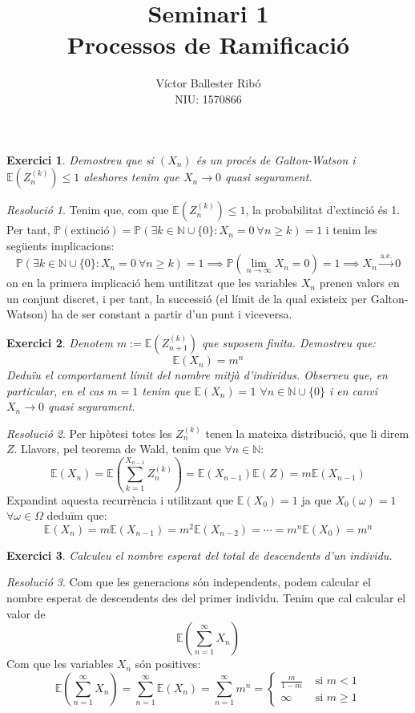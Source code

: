 \documentclass[10pt,a4paper]{article}
\title{\bfseries\Large Seminari 1\\Processos de Ramificació}
\author{Víctor Ballester Ribó\\NIU: 1570866}
\date{\parbox{\linewidth}{\centering
  Processos estocàstic\endgraf
  Grau en Matemàtiques\endgraf
  Universitat Autònoma de Barcelona\endgraf
  Març de 2023}}
\newcommand{\NN}{\ensuremath{\mathbb{N}}} %
\newcommand{\Prob}{\ensuremath{\mathbb{P}}} %
\newcommand{\Exp}{\mathbb{E}} %
\newcommand{\almoste}[1]{\overset{\text{a.e.}}{#1}} %
\newtheorem{exercici}{Exercici}
\theoremstyle{definition}
\theoremstyle{remark}
\newtheorem{res}{Resolució}
\begin{document}
\maketitle
\begin{exercici}
  Demostreu que si $(X_n)$ és un procés de Galton-Watson i $\Exp(Z_n^{(k)}) \leq 1$ aleshores tenim que $X_n \to 0$ quasi segurament.
\end{exercici}
\begin{res}
  Tenim que, com que $\Exp(Z_n^{(k)}) \leq 1$, la probabilitat d'extinció és 1. Per tant, $\Prob(\text{extinció})=\Prob\left(\exists k\in\NN\cup\{0\}:X_n=0\ \forall n\geq k\right)=1$ i tenim les següents implicacions:
  \begin{equation*}
    \Prob\left(\exists k\in\NN\cup\{0\}:X_n=0\ \forall n\geq k\right)=1 \implies\Prob(\lim_{n\to\infty}X_n=0)=1  \implies X_n\almoste{\longrightarrow}0
  \end{equation*}
  on en la primera implicació hem untilitzat que les variables $X_n$ prenen valors en un conjunt discret, i per tant, la successió (el límit de la qual existeix per Galton-Watson) ha de ser constant a partir d'un punt i viceversa.
\end{res}
\begin{exercici}
  Denotem $m:=\Exp(Z_{n+1}^{(k)})$ que suposem finita. Demostreu que: $$\Exp(X_n)=m^n$$
  Deduïu el comportament límit del nombre mitjà d'individus. Observeu que, en particular, en el cas $m=1$ tenim que $\Exp(X_n)=1$ $\forall n\in\NN\cup\{0\}$ i en canvi $X_n\to 0$ quasi segurament.
\end{exercici}
\begin{res}
  Per hipòtesi totes les $Z_n^{(k)}$ tenen la mateixa distribució, que li direm $Z$. Llavors, pel teorema de Wald, tenim que $\forall n\in\NN$:
  $$\Exp(X_n)=\Exp\left(\sum_{k=1}^{X_{n-1}}Z_n^{(k)}\right)=\Exp(X_{n-1})\Exp(Z)=m\Exp(X_{n-1})$$
  Expandint aquesta recurrència i utilitzant que $\Exp(X_0)=1$ ja que $X_0(\omega)=1$ $\forall\omega\in\Omega$ deduïm que:
  $$\Exp(X_n)=m\Exp(X_{n-1})=m^2\Exp(X_{n-2})=\cdots=m^n\Exp(X_0)=m^n$$
\end{res}
\begin{exercici}
  Calculeu el nombre esperat del total de descendents d'un individu.
\end{exercici}
\begin{res}
  Com que les generacions són independents, podem calcular el nombre esperat de descendents des del primer individu. Tenim que cal calcular el valor de $$\Exp\left(\sum_{n=1}^\infty X_n\right)$$
  Com que les variables $X_n$ són positives:
  $$\Exp\left(\sum_{n=1}^\infty X_n\right)=\sum_{n=1}^\infty\Exp(X_n)=\sum_{n=1}^\infty m^n=
    \begin{cases}
      \frac{m}{1-m} & \text{ si $m <1$}     \\
      \infty        & \text{ si $m \geq 1$}
    \end{cases}$$
\end{res}
\end{document}
